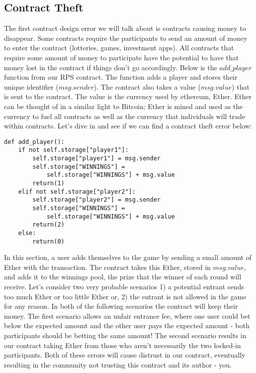 \documentclass[12pt]{article}
\begin{document}
\subsection{Contract Theft}
The first contract design error we will talk about is contracts causing money to disappear. Some contracts require the participants to send an amount of money to enter the contract (lotteries, games, investment apps). All contracts that require some amount of money to participate have the potential to have that money lost in the contract if things don't go accordingly. Below is the $add\_player$ function from our RPS contract. The function adds a player and stores their unique identifier ($msg.sender$). The contract also takes a value ($msg.value$) that is sent to the contract. The value is the currency used by ethereum, Ether. Ether can be thought of in a similar light to Bitcoin; Ether is mined and used as the currency to fuel all contracts as well as the currency that individuals will trade within contracts. Let's dive in and see if we can find a contract theft error below: 

\begin{lstlisting}[frame=single]
def add_player():
	if not self.storage["player1"]:
		self.storage["player1"] = msg.sender
		self.storage["WINNINGS"] = 
			self.storage["WINNINGS"] + msg.value
		return(1)
	elif not self.storage["player2"]:
		self.storage["player2"] = msg.sender
		self.storage["WINNINGS"] = 
			self.storage["WINNINGS"] + msg.value
		return(2)
	else:
		return(0)
\end{lstlisting}

In this section, a user adds themselves to the game by sending a small amount of Ether with the transaction. The contract takes this Ether, stored in $msg.value$, and adds it to the winnings pool, the prize that the winner of each round will receive. Let's consider two very probable scenarios 1) a potential entrant sends too much Ether or too little Ether or, 2) the entrant is not allowed in the game for any reason. In both of the following scenarios the contract will keep their money. The first scenario allows an unfair entrance fee, where one user could bet below the expected amount and the other user pays the expected amount - both participants should be betting the same amount! The second scenario results in our contract taking Ether from those who aren't necessarily the two locked-in participants. Both of these errors will cause distrust in our contract, eventually resulting in the community not trusting this contract and its author - you.
\end{document}
